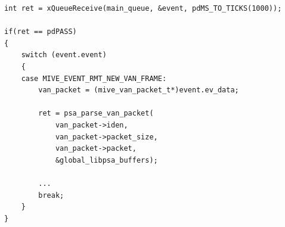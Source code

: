 \begin{listing}[H]
  \begin{verbatim}
int ret = xQueueReceive(main_queue, &event, pdMS_TO_TICKS(1000));

if(ret == pdPASS)
{
    switch (event.event)
    {
    case MIVE_EVENT_RMT_NEW_VAN_FRAME:
        van_packet = (mive_van_packet_t*)event.ev_data;

        ret = psa_parse_van_packet(
            van_packet->iden,
            van_packet->packet_size,
            van_packet->packet,
            &global_libpsa_buffers);
        
        ...
        break;
    }
}
  \end{verbatim}
  \caption{Primjer upravljanja događajima}
\end{listing}